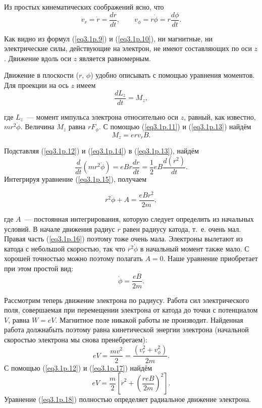 Из простых кинематических соображений ясно, что
\begin{equation}
v_r=\dot{r}=\frac{dr}{dt},\qquad v_{\phi}=r\dot{\phi}=r\frac{d\phi}{dt}.
\label{eq3.1p.12}
\end{equation}

Как видно из формул (\ref{eq3.1p.9}) и (\ref{eq3.1p.10}), ни магнитные, ни электрические силы, действующие на электрон, не имеют составляющих по оси $z$. Движение вдоль оси $z$ является равномерным.

Движение в плоскости ($r$, $\phi$) удобно описывать с помощью уравнения моментов. Для проекции на ось $z$ имеем
\begin{equation}
\frac{dL_{z}}{dt}=M_z,
\label{eq3.1p.13}
\end{equation}

где $L_{z}$~--- момент импульса электрона относительно оси $z$, равный, как известно, $mr^2\dot{\phi}$. Величина $M_z$ равна $rF_{\phi}$. С помощью (\ref{eq3.1p.11}) и (\ref{eq3.1p.13}) найдём
\begin{equation}
M_z=erv_rB.
\label{eq3.1p.14}
\end{equation}

Подставляя (\ref{eq3.1p.12}) и (\ref{eq3.1p.14}) в (\ref{eq3.1p.13}), найдём
\begin{equation}
\frac{d}{dt}\left(mr^2\dot{\phi}\right)=eBr\frac{dr}{dt}=\frac12eB\frac{d(r^2)}{dt}.
\label{eq3.1p.15}
\end{equation}
Интегрируя уравнение (\ref{eq3.1p.15}), получаем

\begin{equation}
r^2\dot{\phi}+A=\frac{eBr^2}{2m},
\label{eq3.1p.16}
\end{equation}

где $A$~--- постоянная интегрирования, которую следует определить из начальных условий. В начале движения радиус $r$ равен радиусу катода, т.~е. очень мал. Правая часть (\ref{eq3.1p.16}) поэтому тоже очень мала. Электроны вылетают из катода с небольшой скоростью, так что $r^{2}\dot{\phi}$ в начальный момент также мало. С хорошей точностью можно поэтому полагать $A=0$. Наше уравнение приобретает при этом простой вид:
\begin{equation}
\dot{\phi}=\frac{eB}{2m}.
\label{eq3.1p.17}
\end{equation}

Рассмотрим теперь движение электрона по радиусу. Работа сил электрического поля, совершаемая при перемещении электрона от катода до точки с потенциалом $V$, равна $W=eV$. Магнитное поле никакой работы не производит. Найденная работа должнабыть поэтому равна кинетической энергии электрона (начальной скоростью электрона мы снова пренебрегаем):
$$
eV=\frac{mv^2}{2}=\frac{(v_r^2+v_\phi^2)}{2m}.
$$
С помощью (\ref{eq3.1p.12}) и (\ref{eq3.1p.17}) найдём
\begin{equation}
eV=\frac{m}{2}\left[\dot{r}^2+\left(\frac{reB}{2m}\right)^2\right].
\label{eq3.1p.18}
\end{equation}
Уравнение (\ref{eq3.1p.18}) полностью определяет радиальное движение электрона.




